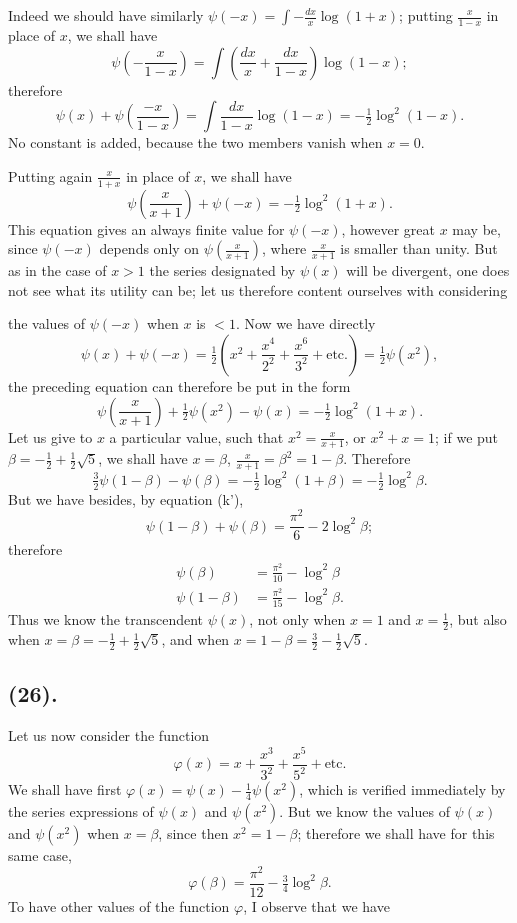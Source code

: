 \documentclass{article}
\begin{document}
Indeed we should have similarly $\psi(-x)=\displaystyle\int-\frac{dx}{x}\log(1+x)$; putting $\frac{x}{1-x}$ in place of $x$, we shall have
\[ \psi\left(-\frac{x}{1-x}\right)=\int\left(\frac{dx}{x}+\frac{dx}{1-x}\right)\log(1-x); \]
therefore
\[ \psi(x)+\psi\left(\frac{-x}{1-x}\right)=\int\frac{dx}{1-x}\log(1-x)=-\tfrac{1}{2}\log^{2}(1-x). \]
No constant is added, because the two members vanish when $x=0$.

Putting again $\frac{x}{1+x}$ in place of $x$, we shall have
\[ \psi\left(\frac{x}{x+1}\right)+\psi(-x)=-\tfrac{1}{2}\log^{2}(1+x). \]
This equation gives an always finite value for $\psi(-x)$, however great $x$ may be, since $\psi(-x)$ depends only on $\psi\left(\frac{x}{x+1}\right)$, where $\frac{x}{x+1}$ is smaller than unity. But as in the case of $x>1$ the series designated by $\psi(x)$ will be divergent, one does not see what its utility can be; let us therefore content ourselves with considering

the values of $\psi(-x)$ when $x$ is ${}<1$. Now we have directly
\[ \psi(x)+\psi(-x)=\tfrac{1}{2}\left(x^{2}+\frac{x^{4}}{2^{2}}+\frac{x^{6}}{3^{2}}+\text{etc.}\right)=\tfrac{1}{2}\psi(x^{2}), \]
the preceding equation can therefore be put in the form
\[ \psi\left(\frac{x}{x+1}\right)+\tfrac{1}{2}\psi(x^{2})-\psi(x)=-\tfrac{1}{2}\log^{2}(1+x). \]
Let us give to $x$ a particular value, such that $x^{2}=\frac{x}{x+1}$, or $x^{2}+x=1$; if we put $\beta=-\frac{1}{2}+\frac{1}{2}\sqrt{5}$, we shall have $x=\beta$, $\frac{x}{x+1}=\beta^{2}=1-\beta$. Therefore
\[ \tfrac{3}{2}\psi(1-\beta)-\psi(\beta)=-\tfrac{1}{2}\log^{2}(1+\beta)=-\tfrac{1}{2}\log^{2}\beta. \]
But we have besides, by equation (k'),
\[ \psi(1-\beta)+\psi(\beta)=\frac{\pi^{2}}{6}-2\log^{2}\beta; \]
therefore
\[ \begin{aligned} \psi(\beta)&=\frac{\pi^{2}}{10}-\log^{2}\beta\\ \psi(1-\beta)&=\frac{\pi^{2}}{15}-\log^{2}\beta. \end{aligned} \]
Thus we know the transcendent $\psi(x)$, not only when $x=1$ and $x=\frac{1}{2}$, but also when $x=\beta=-\frac{1}{2}+\frac{1}{2}\sqrt{5}$, and when $x=1-\beta=\frac{3}{2}-\frac{1}{2}\sqrt{5}$.

\subsection*{(26).}

Let us now consider the function
\[ \varphi(x)=x+\frac{x^{3}}{3^{2}}+\frac{x^{5}}{5^{2}}+\text{etc.} \]
We shall have first $\varphi(x)=\psi(x)-\frac{1}{4}\psi(x^{2})$, which is verified immediately by the series expressions of $\psi(x)$ and $\psi(x^{2})$. But we know the values of $\psi(x)$ and $\psi(x^{2})$ when $x=\beta$, since then $x^{2}=1-\beta$; therefore we shall have for this same case,
\[ \varphi(\beta)=\frac{\pi^{2}}{12}-\tfrac{3}{4}\log^{2}\beta. \]
To have other values of the function $\varphi$, I observe that we have
\end{document}
